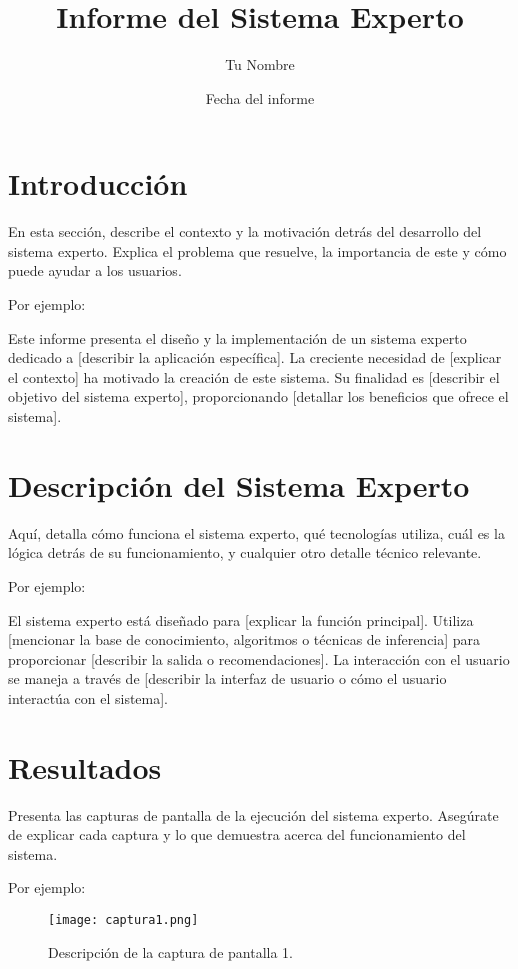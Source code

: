 \documentclass{article}
\title{Informe del Sistema Experto}
\author{Tu Nombre}
\date{Fecha del informe}
\begin{document}
\maketitle

\section{Introducción}

En esta sección, describe el contexto y la motivación detrás del desarrollo del sistema experto. Explica el problema que resuelve, la importancia de este y cómo puede ayudar a los usuarios.

Por ejemplo:

Este informe presenta el diseño y la implementación de un sistema experto dedicado a [describir la aplicación específica]. La creciente necesidad de [explicar el contexto] ha motivado la creación de este sistema. Su finalidad es [describir el objetivo del sistema experto], proporcionando [detallar los beneficios que ofrece el sistema].

\section{Descripción del Sistema Experto}

Aquí, detalla cómo funciona el sistema experto, qué tecnologías utiliza, cuál es la lógica detrás de su funcionamiento, y cualquier otro detalle técnico relevante.

Por ejemplo:

El sistema experto está diseñado para [explicar la función principal]. Utiliza [mencionar la base de conocimiento, algoritmos o técnicas de inferencia] para proporcionar [describir la salida o recomendaciones]. La interacción con el usuario se maneja a través de [describir la interfaz de usuario o cómo el usuario interactúa con el sistema].

\section{Resultados}

Presenta las capturas de pantalla de la ejecución del sistema experto. Asegúrate de explicar cada captura y lo que demuestra acerca del funcionamiento del sistema.

Por ejemplo:

\begin{figure}[h!]
  \centering
  \texttt{[image: captura1.png]}
  \caption{Descripción de la captura de pantalla 1.}
\end{figure}
\end{document}
